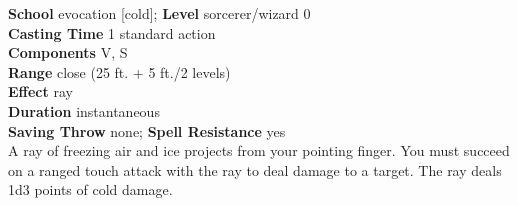 \textbf{School} evocation [cold]; \textbf{Level} sorcerer/wizard 0\\
\textbf{Casting Time} 1 standard action\\
\textbf{Components} V, S\\
\textbf{Range} close (25 ft. + 5 ft./2 levels)\\
\textbf{Effect} ray\\
\textbf{Duration} instantaneous\\
\textbf{Saving Throw} none; \textbf{Spell Resistance} yes\\
A ray of freezing air and ice projects from your pointing finger. You must succeed on a ranged touch attack with the ray to deal damage to a target. The ray deals 1d3 points of cold damage.\\
